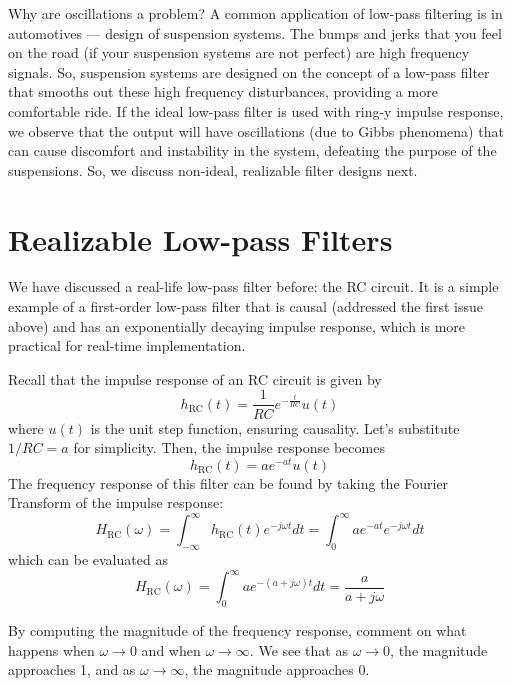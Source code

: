Why are oscillations a problem? A common application of low-pass filtering is in automotives --- design of suspension systems. The bumps and jerks that you feel on the road (if your suspension systems are not perfect) are high frequency signals. So, suspension systems are designed on the concept of a low-pass filter that smooths out these high frequency disturbances, providing a more comfortable ride. If the ideal low-pass filter is used with ring-y impulse response, we observe that the output will have oscillations (due to Gibbs phenomena) that can cause discomfort and instability in the system, defeating the purpose of the suspensions. So, we discuss non-ideal, realizable filter designs next.

\section{Realizable Low-pass Filters}
We have discussed a real-life low-pass filter before: the RC circuit. It is a simple example of a first-order low-pass filter that is causal (addressed the first issue above) and has an exponentially decaying impulse response, which is more practical for real-time implementation.

Recall that the impulse response of an RC circuit is given by 
\[
h_{\text{RC}}(t) = \frac{1}{RC} e^{-\frac{t}{RC}} u(t)
\]
where $u(t)$ is the unit step function, ensuring causality. Let's substitute $1/RC = a$ for simplicity. Then, the impulse response becomes
\[
h_{\text{RC}}(t) = a e^{-a t} u(t)
\]
The frequency response of this filter can be found by taking the Fourier Transform of the impulse response:
\[
H_{\text{RC}}(\omega) = \int_{-\infty}^{\infty} h_{\text{RC}}(t) e^{-j \omega t} dt = \int_0^{\infty} a e^{-a t} e^{-j \omega t} dt
\]
which can be evaluated as
\[
H_{\text{RC}}(\omega) = \int_0^{\infty} a e^{-(a + j \omega) t} dt = \frac{a}{a + j \omega}
\]

\begin{popquiz}
    By computing the magnitude of the frequency response, comment on what happens when $\omega \to 0$ and when $\omega \to \infty$.
    \popqsplit 
    We see that as $\omega \to 0$, the magnitude approaches 1, and as $\omega \to \infty$, the magnitude approaches 0.
\end{popquiz}
